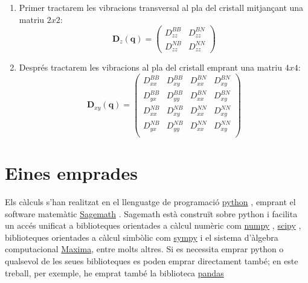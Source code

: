 \documentclass[12pt]{article} %
\let\vec\mathbf %
\begin{document}
\begin{enumerate}
 \item Primer tractarem les vibracions transversal al pla del cristall mitjançant una matriu $2x2$:
 \begin{equation}
  \vec D_z(\vec q)=
  \begin{pmatrix}
    D_{zz}^{BB}  & D_{zz}^{BN}        \\
    D_{zz}^{NB}  & D_{zz}^{NN} 
  \end{pmatrix}
\end{equation}

 \item Després tractarem les vibracions al pla del cristall emprant una matriu $4x4$:
 \begin{equation}
  \vec D_{xy}(\vec q)=
  \begin{pmatrix}
   D_{xx}^{BB} & D_{xy}^{BB} & D_{xx}^{BN} & D_{xy}^{BN}  \\
   D_{yx}^{BB} & D_{yy}^{BB} & D_{xx}^{BN} & D_{xy}^{BN}  \\
   D_{xx}^{NB} & D_{xy}^{NB} & D_{xx}^{NN} & D_{xy}^{NN} \\
   D_{yx}^{NB} & D_{yy}^{NB} & D_{xx}^{NN} & D_{xy}^{NN} \\
  \end{pmatrix}
\end{equation}

\end{enumerate}


\section{Eines emprades}

Els càlculs s'han realitzat en el llenguatge de programació \href{https://www.python.org/}{python} \cite{4160250}, emprant el software matemàtic \href{https://www.sagemath.org/}{Sagemath} \cite{sagemath}. Sagemath està construït sobre python i facilita un accés unificat a biblioteques orientades a càlcul numèric com \href{https://numpy.org/}{numpy} \cite{harris2020array} , \href{https://scipy.org/}{scipy} \cite{2020SciPy-NMeth}, biblioteques orientades a càlcul simbòlic com \href{https://www.sympy.org/}{sympy} i el sistema d'àlgebra computacional \href{https://maxima.sourceforge.io/}{Maxima}, entre molts altres. Si es necessita emprar python o qualsevol de les seues biblioteques es poden emprar directament també; en este treball, per exemple, he emprat també la biblioteca \href{https://pandas.pydata.org/}{pandas}\cite{reback2020pandas} 
\end{document}
